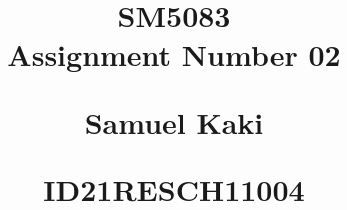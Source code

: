 \documentclass[journal,12pt,twocolumn]{IEEEtran}
\begin{document}
%


\newtheorem{theorem}{Theorem}[section]
\newtheorem{problem}{Problem}
\newtheorem{proposition}{Proposition}[section]
\newtheorem{lemma}{Lemma}[section]
\newtheorem{corollary}[theorem]{Corollary}
\newtheorem{example}{Example}[section]
\newtheorem{definition}[problem]{Definition}
\newcommand{\BEQA}{\begin{eqnarray}}
\newcommand{\EEQA}{\end{eqnarray}}
\newcommand{\define}{\stackrel{\triangle}{=}}

\providecommand{\mbf}{\mathbf}
\providecommand{\pr}[1]{\ensuremath{\Pr\left(#1\right)}}
\providecommand{\qfunc}[1]{\ensuremath{Q\left(#1\right)}}
\providecommand{\sbrak}[1]{\ensuremath{{}\left[#1\right]}}
\providecommand{\lsbrak}[1]{\ensuremath{{}\left[#1\right.}}
\providecommand{\rsbrak}[1]{\ensuremath{{}\left.#1\right]}}
\providecommand{\brak}[1]{\ensuremath{\left(#1\right)}}
\providecommand{\lbrak}[1]{\ensuremath{\left(#1\right.}}
\providecommand{\rbrak}[1]{\ensuremath{\left.#1\right)}}
\providecommand{\cbrak}[1]{\ensuremath{\left\{#1\right\}}}
\providecommand{\lcbrak}[1]{\ensuremath{\left\{#1\right.}}
\providecommand{\rcbrak}[1]{\ensuremath{\left.#1\right\}}}
\theoremstyle{remark}
\newtheorem{rem}{Remark}
\newcommand{\sgn}{\mathop{\mathrm{sgn}}}
\providecommand{\abs}[1]{\lvert#1\rvert}
\providecommand{\res}[1]{\Res\displaylimits_{#1}} 
\providecommand{\norm}[1]{\lVert#1\rVert}
\providecommand{\mtx}[1]{\mathbf{#1}}
\providecommand{\fourier}{\overset{\mathcal{F}}{ \rightleftharpoons}}
\providecommand{\system}{\overset{\mathcal{H}}{ \longleftrightarrow}}
\newcommand{\solution}{\noindent \textbf{Solution: }}
\newcommand{\cosec}{\,\text{cosec}\,}
\providecommand{\dec}[2]{\ensuremath{\overset{#1}{\underset{#2}{\gtrless}}}}
\newcommand{\myvec}[1]{\ensuremath{\begin{pmatrix}#1\end{pmatrix}}}
\newcommand{\cmyvec}[1]{\ensuremath{\begin{pmatrix*}[c]#1\end{pmatrix*}}}
\newcommand{\mydet}[1]{\ensuremath{\begin{vmatrix}#1\end{vmatrix}}}
\newcommand{\proj}[2]{\textbf{proj}_{\vec{#1}}\vec{#2}}
\newcommand{\RNum}[1]{\uppercase\expandafter{\romannumeral #1\relax}}
\let\StandardTheFigure\thefigure
\let\vec\mathbf
\title{
\LARGE SM5083\\
    \textbf{\LARGE Assignment Number 02 \\[0.5em]}
    
    \large \textbf{\Large Samuel Kaki} \par
    \large   ID21RESCH11004  \par
}
\end{document}
